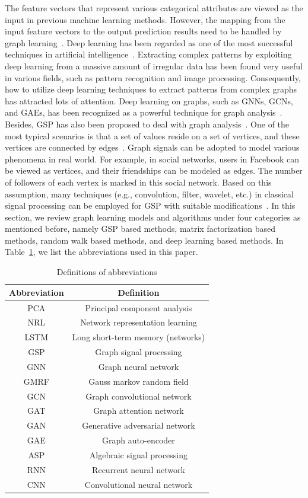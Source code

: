 \label{sec:algorithm}
The feature vectors that represent various categorical attributes are viewed as the input in previous machine learning methods. However, the mapping from the input feature vectors to the output prediction results need to be handled by graph learning~. Deep learning has been regarded as one of the most successful techniques in artificial intelligence~. Extracting complex patterns by exploiting deep learning from a massive amount of irregular data has been found very useful in various fields, such as pattern recognition and image processing. Consequently, how to utilize deep learning techniques to extract patterns from complex graphs has attracted lots of attention. Deep learning on graphs, such as GNNs, GCNs, and GAEs, has been recognized as a powerful technique for graph analysis~. Besides, GSP has also been proposed to deal with graph analysis~. One of the most typical scenarios is that a set of values reside on a set of vertices, and these vertices are connected by edges~. Graph signals can be adopted to model various phenomena in real world. For example, in social networks, users in Facebook can be viewed as vertices, and their friendships can be modeled as edges. The number of followers of each vertex is marked in this social network. Based on this assumption, many techniques (e.g., convolution, filter, wavelet, etc.) in classical signal processing can be employed for GSP with suitable modifications~.
In this section, we review graph learning models and algorithms under four categories as mentioned before, namely GSP based methods, matrix factorization based methods, random walk based methods, and deep learning based methods. In Table~\ref{tab:abbreviations}, we list the abbreviations used in this paper.
\begin{table}[htbp]
  \centering
  \caption{Definitions of abbreviations}
    \begin{tabular}{cc}
    \toprule
    \textbf{Abbreviation} & \textbf{Definition} \\
    \midrule
    PCA   & Principal component analysis  \\
    NRL   &  Network representation learning \\
    LSTM  &  Long short-term memory (networks)  \\
    GSP   & Graph signal processing \\
    GNN  &  Graph neural network \\
    GMRF  & Gauss markov random field \\
    GCN  & Graph convolutional network \\
    GAT  &  Graph attention network  \\
    GAN   &  Generative adversarial network  \\
    GAE  & Graph auto-encoder \\
    ASP   & Algebraic signal processing \\
     RNN &  Recurrent neural network \\
     CNN & Convolutional neural network \\
    \bottomrule
    \end{tabular}
  \label{tab:abbreviations}
\end{table}

